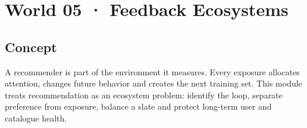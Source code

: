 \section{World 05 · Feedback Ecosystems}

\begin{abstract}
The policy allocates attention and then learns from that allocation. Ecosystem quality must be designed, not assumed.
\end{abstract}

\subsection{Concept}
A recommender is part of the environment it measures. Every exposure allocates attention, changes future behavior and creates the next training set. This module treats recommendation as an ecosystem problem: identify the loop, separate preference from exposure, balance a slate and protect long-term user and catalogue health.

